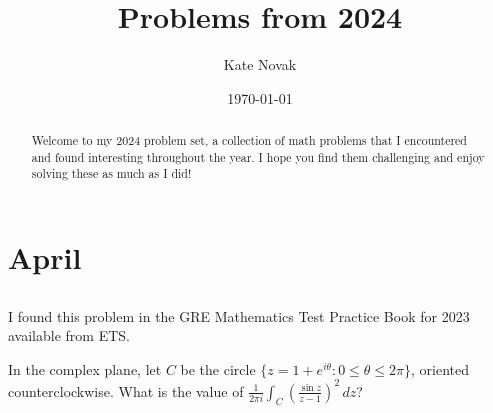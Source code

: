 \documentclass[12pt]{article}
\title{Problems from 2024}
\author{Kate Novak}
\date{\today}
\begin{document}
\maketitle

\begin{abstract}
Welcome to my 2024 problem set, a collection of math problems that I encountered and found interesting throughout the year.
I hope you find them challenging and enjoy solving these as much as I did!
\end{abstract}

\setcounter{section}{3}
\section{April}

\subsection{}

I found this problem in the GRE Mathematics Test Practice Book for 2023 available from ETS.

In the complex plane, let $C$ be the circle $\{ z = 1 + e^{i\theta} : 0 \le \theta \le 2\pi\}$, oriented counterclockwise. What is the value of $\frac{1}{2 \pi i} \int_{C} \left( \frac{\sin z}{z - 1} \right)^2\,dz$?
\end{document}

